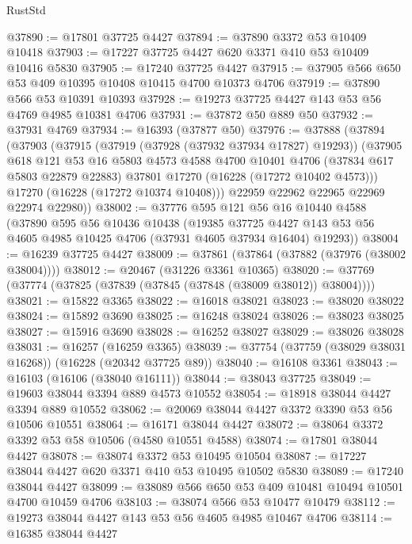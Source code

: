 \begin{lexlean}{RustStd}
\begin{coremodule}
@37890 := @17801 @37725 @4427
@37894 := @37890 @3372 @53 @10409 @10418
@37903 := @17227 @37725 @4427 @620 @3371 @410 @53 @10409 @10416 @5830
@37905 := @17240 @37725 @4427
@37915 := @37905 @566 @650 @53 @409 @10395 @10408 @10415 @4700 @10373 @4706
@37919 := @37890 @566 @53 @10391 @10393
@37928 := @19273 @37725 @4427 @143 @53 @56 @4769 @4985 @10381 @4706
@37931 := @37872 @50 @889 @50
@37932 := @37931 @4769
@37934 := @16393 (@37877 @50)
@37976 := @37888
    (@37894
      (@37903
        (@37915
          (@37919 (@37928 (@37932 @37934 @17827) @19293))
          (@37905
            @618
            @121
            @53
            @16
            @5803
            @4573
            @4588
            @4700
            @10401
            @4706
            (@37834 @617 @5803 @22879 @22883)
            @37801
            @17270
            (@16228 (@17272 @10402 @4573)))
          @17270
          (@16228 (@17272 @10374 @10408)))
        @22959
        @22962
        @22965
        @22969
        @22974
        @22980))
@38002 := @37776
    @595
    @121
    @56
    @16
    @10440
    @4588
    (@37890
      @595
      @56
      @10436
      @10438
      (@19385
        @37725
        @4427
        @143
        @53
        @56
        @4605
        @4985
        @10425
        @4706
        (@37931 @4605 @37934 @16404)
        @19293))
@38004 := @16239 @37725 @4427
@38009 := @37861 (@37864 (@37882 (@37976 (@38002 @38004))))
@38012 := @20467 (@31226 @3361 @10365)
@38020 := @37769 (@37774 (@37825 (@37839 (@37845 (@37848 (@38009 @38012)) @38004))))
@38021 := @15822 @3365
@38022 := @16018 @38021
@38023 := @38020 @38022
@38024 := @15892 @3690
@38025 := @16248 @38024
@38026 := @38023 @38025
@38027 := @15916 @3690
@38028 := @16252 @38027
@38029 := @38026 @38028
@38031 := @16257 (@16259 @3365)
@38039 := @37754 (@37759 (@38029 @38031 @16268)) (@16228 (@20342 @37725 @89))
@38040 := @16108 @3361
@38043 := @16103 (@16106 (@38040 @16111))
@38044 := @38043 @37725
@38049 := @19603 @38044 @3394 @889 @4573 @10552
@38054 := @18918 @38044 @4427 @3394 @889 @10552
@38062 := @20069 @38044 @4427 @3372 @3390 @53 @56 @10506 @10551
@38064 := @16171 @38044 @4427
@38072 := @38064 @3372 @3392 @53 @58 @10506 (@4580 @10551 @4588)
@38074 := @17801 @38044 @4427
@38078 := @38074 @3372 @53 @10495 @10504
@38087 := @17227 @38044 @4427 @620 @3371 @410 @53 @10495 @10502 @5830
@38089 := @17240 @38044 @4427
@38099 := @38089 @566 @650 @53 @409 @10481 @10494 @10501 @4700 @10459 @4706
@38103 := @38074 @566 @53 @10477 @10479
@38112 := @19273 @38044 @4427 @143 @53 @56 @4605 @4985 @10467 @4706
@38114 := @16385 @38044 @4427

\end{coremodule}
\end{lexlean}
